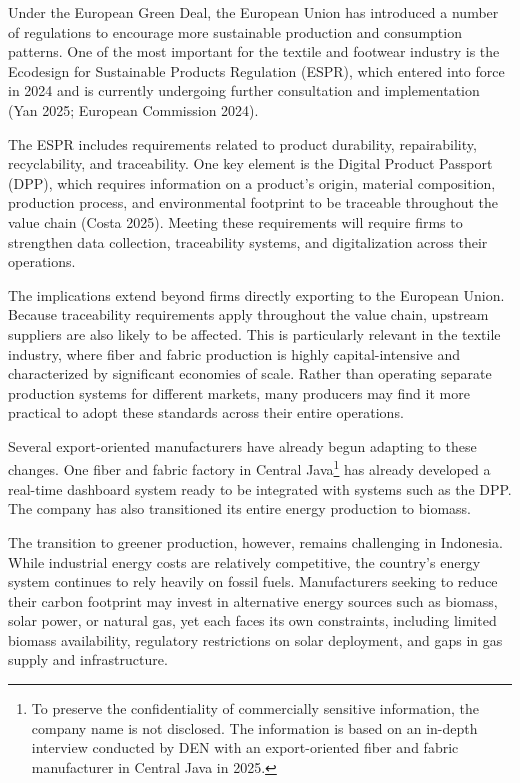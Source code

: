 \documentclass[
  manuscript=article,
  layout=publish,
  year=2026,
  volume=1,
]{den}
\begin{document}
Under the European Green Deal, the European Union has introduced a
number of regulations to encourage more sustainable production and
consumption patterns. One of the most important for the textile and
footwear industry is the Ecodesign for Sustainable Products Regulation
(ESPR), which entered into force in 2024 and is currently undergoing
further consultation and implementation (Yan 2025; European Commission
2024).

The ESPR includes requirements related to product durability,
repairability, recyclability, and traceability. One key element is the
Digital Product Passport (DPP), which requires information on a
product's origin, material composition, production process, and
environmental footprint to be traceable throughout the value chain
(Costa 2025). Meeting these requirements will require firms to
strengthen data collection, traceability systems, and digitalization
across their operations.

The implications extend beyond firms directly exporting to the European
Union. Because traceability requirements apply throughout the value
chain, upstream suppliers are also likely to be affected. This is
particularly relevant in the textile industry, where fiber and fabric
production is highly capital-intensive and characterized by significant
economies of scale. Rather than operating separate production systems
for different markets, many producers may find it more practical to
adopt these standards across their entire operations.

Several export-oriented manufacturers have already begun adapting to
these changes. One fiber and fabric factory in Central Java\footnote{To
  preserve the confidentiality of commercially sensitive information,
  the company name is not disclosed. The information is based on an
  in-depth interview conducted by DEN with an export-oriented fiber and
  fabric manufacturer in Central Java in 2025.} has already developed a
real-time dashboard system ready to be integrated with systems such as
the DPP. The company has also transitioned its entire energy production
to biomass.

The transition to greener production, however, remains challenging in
Indonesia. While industrial energy costs are relatively competitive, the
country's energy system continues to rely heavily on fossil fuels.
Manufacturers seeking to reduce their carbon footprint may invest in
alternative energy sources such as biomass, solar power, or natural gas,
yet each faces its own constraints, including limited biomass
availability, regulatory restrictions on solar deployment, and gaps in
gas supply and infrastructure.
\end{document}
